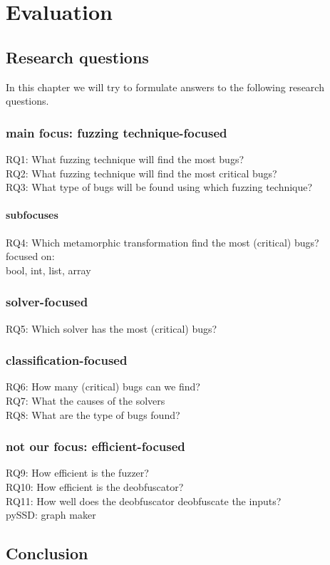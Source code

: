 \chapter{Evaluation}
\label{cha:eval}
\label{cha:intro}


\section{Research questions}
\label{eval:RQ}
In this chapter we will try to formulate answers to the following research questions.
\subsection{main focus: fuzzing technique-focused}
RQ1: What fuzzing technique will find the most bugs?\\
RQ2: What fuzzing technique will find the most critical bugs?\\
RQ3: What type of bugs will be found using which fuzzing technique?\\
\subsubsection{subfocuses}
RQ4: Which metamorphic transformation find the most (critical) bugs?\\
focused on: \\
bool, int, list, array
\subsection{solver-focused}
RQ5: Which solver has the most (critical) bugs?\\
\subsection{classification-focused}
RQ6: How many (critical) bugs can we find?\\
RQ7: What the causes of the solvers\\
RQ8: What are the type of bugs found?\\
\subsection{not our focus: efficient-focused} 
RQ9: How efficient is the fuzzer?\\
RQ10: How efficient is the deobfuscator?\\
RQ11: How well does the deobfuscator deobfuscate the inputs?\\

pySSD: graph maker

\section{Conclusion}
\label{eval:conclusion}


